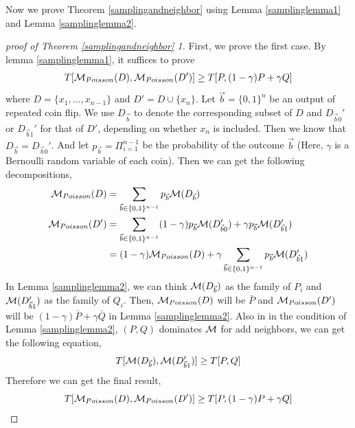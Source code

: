 \documentclass{article}
\begin{document}
Now we prove Theorem \ref{samplingandneighbor} using Lemma \ref{samplinglemma1} and Lemma \ref{samplinglemma2}.
\begin{proof}[proof of Theorem \ref{samplingandneighbor} 1]
First, we prove the first case. By lemma \ref{samplinglemma1}, it suffices to prove
\begin{equation*}
    T[{\mathcal{M}}_{Poisson}(D),{\mathcal{M}}_{Poisson}(D')] \ge T[P,(1-\gamma)P +\gamma Q]
\end{equation*}
where $D = \{x_1,\dots,x_{n-1}\}$ and $D' = D \cup \{x_n\}$. Let $\vec{b} = \{0,1\}^n$ be an output of repeated coin flip. We use $D_{\vec{b}}$ to denote the corresponding subset of $D$ and $D_{\vec{b}0}'$ or $D_{\vec{b}1}'$ for that of $D'$, depending on whether $x_n$ is included. Then we know that $D_{\vec{b}} =D_{\vec{b}0}'$. And let $p_{\vec{b}} = \Pi_{i = 1}^{n-1}$ be the probability of the outcome $\vec{b}$ (Here, $\gamma$ is a Bernoulli random variable of each coin). Then we can get the following decompositions,
\begin{align*}
    {\mathcal{M}}_{Poisson}(D) &= \sum_{\vec{b} \in \{0,1\}^{n-1}} p_{\vec{b}} {\mathcal{M}}(D_{\vec{b}})\\
    {\mathcal{M}}_{Poisson}(D') &= \sum_{\vec{b} \in \{0,1\}^{n-1}} (1-\gamma)p_{\vec{b}} {\mathcal{M}}(D'_{\vec{b}0}) + \gamma p_{\vec{b}} {\mathcal{M}}(D'_{\vec{b}1})\\
    &= (1-\gamma) {\mathcal{M}}_{Poisson}(D)  + \gamma \sum_{\vec{b} \in \{0,1\}^{n-1}} p_{\vec{b}} {\mathcal{M}}(D'_{\vec{b}1})
\end{align*}
In Lemma \ref{samplinglemma2}, we can think ${\mathcal{M}}(D_{\vec{b}})$ as the family of $P_i$ and ${\mathcal{M}}(D'_{\vec{b}1})$ as the family of $Q_i$. Then, ${\mathcal{M}}_{Poisson}(D)$ will be $\bar{P}$ and ${\mathcal{M}}_{Poisson}(D')$ will be $(1-\gamma) \bar{P} + \gamma \bar{Q}$ in Lemma \ref{samplinglemma2}. Also in in the condition of Lemma \ref{samplinglemma2}, $(P,Q)$ dominates ${\mathcal{M}}$ for add neighbors, we can get the following equation,
\begin{equation*}
    T[{\mathcal{M}}(D_{\vec{b}}), {\mathcal{M}}(D'_{\vec{b}1})] \ge T[P,Q]
\end{equation*}
Therefore we can get the final result,
\begin{equation*}
    T[{\mathcal{M}}_{Poisson}(D),{\mathcal{M}}_{Poisson}(D')] \ge T[P,(1-\gamma)P +\gamma Q]
\end{equation*}

\end{proof}
\end{document}
